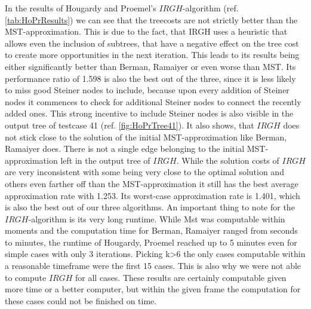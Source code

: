 In the results of Hougardy and Proemel's $IRGH$-algorithm (ref. \ref{tab:HoPrResults}) we can see that the treecosts are not strictly better than the MST-approximation. This is due to the fact, that IRGH uses a heuristic that allows even the inclusion of subtrees, that have a negative effect on the tree cost to create more opportunities in the next iteration. This leads to its results being either significantly better than Berman, Ramaiyer or even worse than MST. Its performance ratio of 1.598 is also the best out of the three, since it is less likely to miss good Steiner nodes to include, because upon every addition of Steiner nodes it commences to check for additional Steiner nodes to connect the recently added ones. This strong incentive to include Steiner nodes is also visible in the output tree of testcase 41 (ref. \ref{fig:HoPrTree41}). It also shows, that $IRGH$ does not stick close to the solution of the initial MST-approximation like Berman, Ramaiyer does. There is not a single edge belonging to the initial MST-approximation left in the output tree of $IRGH$. While the solution costs of $IRGH$ are very inconsistent with some being very close to the optimal solution and others even farther off than the MST-approximation it still has the best average approximation rate with 1.253. Its worst-case approximation rate is 1.401, which is also the best out of our three algorithms. An important thing to note for the $IRGH$-algorithm is its very long runtime. While Mst was computable within moments and the computation time for Berman, Ramaiyer ranged from seconds to minutes, the runtime of Hougardy, Proemel reached up to 5 minutes even for simple cases with only 3 iterations. Picking k>6 the only cases computable within a reasonable timeframe were the first 15 cases. This is also why we were not able to compute $IRGH$ for all cases. These results are certainly computable given more time or a better computer, but within the given frame the computation for these cases could not be finished on time.

